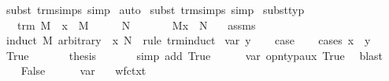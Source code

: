 \begin{isabellebody}
\ {\isacharparenleft}subst\ trm{\isachardot}simps{\isacharcomma}\ simp{\isacharparenright}{\isacharplus}\isanewline
{}\isamarkupfalse%
\ auto{\isacharbrackleft}{}{\isacharbrackright}\isanewline
{}\isamarkupfalse%
\ {\isacharparenleft}subst\ trm{\isachardot}simps{\isacharcomma}\ simp{\isacharparenright}%
\endisatagproof
{\isafoldproof}%
%
\isadelimproof
\isanewline
%
\endisadelimproof
\isanewline
{}\isamarkupfalse%
\ subst{\isacharunderscore}typ{\isacharcolon}\isanewline
\ \ \ {\isachardoublequoteopen}trm\ M{\isachardoublequoteclose}\ \ {\isachardoublequoteopen}{\isacharparenleft}{\isacharparenleft}x{\isacharcomma}{\isasymtau}{\isacharparenright}{\isacharhash}{\isasymGamma}{\isacharparenright}\ {\isasymturnstile}\ M\ {\isacharcolon}\ {\isasymsigma}{\isachardoublequoteclose}\ \ {\isachardoublequoteopen}{\isasymGamma}\ {\isasymturnstile}\ N\ {\isacharcolon}\ {\isasymtau}{\isachardoublequoteclose}\isanewline
\ \ \ {\isachardoublequoteopen}{\isasymGamma}\ {\isasymturnstile}\ M{\isacharbrackleft}x\ {\isacharcolon}{\isacharcolon}{\isacharequal}\ N{\isacharbrackright}\ {\isacharcolon}\ {\isasymsigma}{\isachardoublequoteclose}\isanewline
%
\isadelimproof
%
\endisadelimproof
%
\isatagproof
{}\isamarkupfalse%
\ assms\ \isamarkupfalse%
\ {\isacharparenleft}induct\ M\ arbitrary{\isacharcolon}\ {\isasymGamma}\ x\ N\ {\isasymsigma}\ rule{\isacharcolon}\ trm{\isachardot}induct{\isacharparenright}\isanewline
{}\isamarkupfalse%
\ {\isacharparenleft}var\ y{\isacharparenright}\isanewline
\ \ \isamarkupfalse%
\ {\isacharquery}case\isanewline
\ \ \isamarkupfalse%
\ {\isacharparenleft}cases\ {\isachardoublequoteopen}x\ {\isacharequal}\ y{\isachardoublequoteclose}{\isacharparenright}\isanewline
\ \ \isamarkupfalse%
\ True\ \isanewline
\ \ \ \ \isamarkupfalse%
\ {\isacharquery}thesis\ \isanewline
\ \ \ \ \isamarkupfalse%
\ {\isacharparenleft}simp\ add{\isacharcolon}\ True{\isacharparenright}\isanewline
\ \ \ \ \isamarkupfalse%
\ var\ opn{\isacharunderscore}typ{\isacharunderscore}aux\ True\ \isamarkupfalse%
\ blast\isanewline
\ \ \isamarkupfalse%
\isanewline
\ \ \isamarkupfalse%
\ False\isanewline
\ \ \ \ \isamarkupfalse%
\ var\ \isamarkupfalse%
\ {}{\isacharcolon}\ {\isachardoublequoteopen}wf{\isacharunderscore}ctxt\ {\isasymGamma}{\isachardoublequoteclose}\ \isamarkupfalse%

\end{isabellebody}
